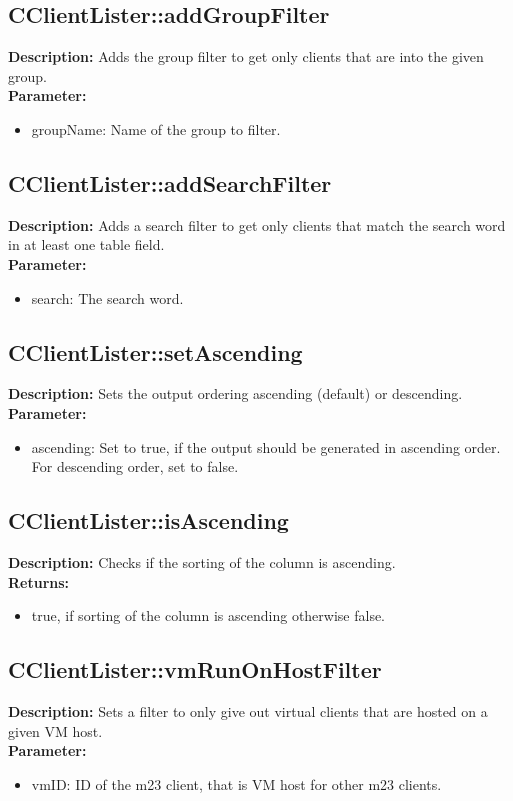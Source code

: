 \subsection{CClientLister::addGroupFilter}
\textbf{Description:} Adds the group filter to get only clients that are into the given group.\\
\textbf{Parameter:}
\begin{itemize}
\item groupName: Name of the group to filter.
\end{itemize}

\subsection{CClientLister::addSearchFilter}
\textbf{Description:} Adds a search filter to get only clients that match the search word in at least one table field.\\
\textbf{Parameter:}
\begin{itemize}
\item search: The search word.
\end{itemize}

\subsection{CClientLister::setAscending}
\textbf{Description:} Sets the output ordering ascending (default) or descending.\\
\textbf{Parameter:}
\begin{itemize}
\item ascending: Set to true, if the output should be generated in ascending order. For descending order, set to false.
\end{itemize}

\subsection{CClientLister::isAscending}
\textbf{Description:} Checks if the sorting of the column is ascending.\\
\textbf{Returns:}
\begin{itemize}
\item true, if sorting of the column is ascending otherwise false.
\end{itemize}

\subsection{CClientLister::vmRunOnHostFilter}
\textbf{Description:} Sets a filter to only give out virtual clients that are hosted on a given VM host.\\
\textbf{Parameter:}
\begin{itemize}
\item vmID: ID of the m23 client, that is VM host for other m23 clients.
\end{itemize}

